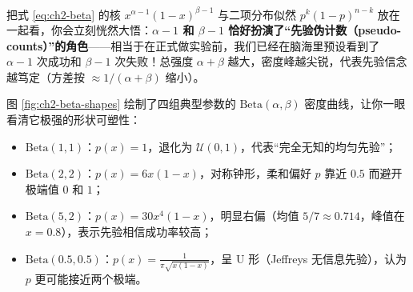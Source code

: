 把式 \eqref{eq:ch2-beta} 的核 $x^{\alpha-1}(1-x)^{\beta-1}$ 与二项分布似然 $p^k(1-p)^{n-k}$ 放在一起看，你会立刻恍然大悟：\textbf{$\alpha - 1$ 和 $\beta - 1$ 恰好扮演了“先验伪计数（pseudo-counts）”的角色}——相当于在正式做实验前，我们已经在脑海里预设看到了 $\alpha - 1$ 次成功和 $\beta - 1$ 次失败！总强度 $\alpha + \beta$ 越大，密度峰越尖锐，代表先验信念越笃定（方差按 $\approx 1/(\alpha+\beta)$ 缩小）。

图 \ref{fig:ch2-beta-shapes} 绘制了四组典型参数的 $\mathrm{Beta}(\alpha, \beta)$ 密度曲线，让你一眼看清它极强的形状可塑性：
\begin{itemize}
  \item $\mathrm{Beta}(1, 1)$：$p(x)=1$，退化为 $\mathcal{U}(0,1)$，代表“完全无知的均匀先验”；
  \item $\mathrm{Beta}(2, 2)$：$p(x)=6x(1-x)$，对称钟形，柔和偏好 $p$ 靠近 $0.5$ 而避开极端值 $0$ 和 $1$；
  \item $\mathrm{Beta}(5, 2)$：$p(x)=30x^4(1-x)$，明显右偏（均值 $5/7 \approx 0.714$，峰值在 $x=0.8$），表示先验相信成功率较高；
  \item $\mathrm{Beta}(0.5, 0.5)$：$p(x)=\frac{1}{\pi\sqrt{x(1-x)}}$，呈 U 形（Jeffreys 无信息先验），认为 $p$ 更可能接近两个极端。
\end{itemize}

